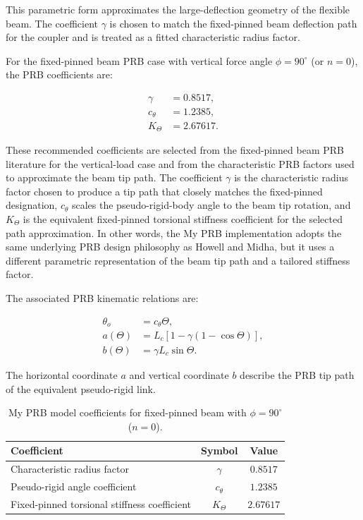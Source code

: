 \documentclass[colorlinks,upint,subscriptcorrection,varvw,hyphenate]{asmeconf}
\begin{document}
This parametric form approximates the large-deflection geometry of the flexible beam. The coefficient $\gamma$ is chosen to match the fixed-pinned beam deflection path for the coupler and is treated as a fitted characteristic radius factor.

For the fixed-pinned beam PRB case with vertical force angle $\phi = 90^\circ$ (or $n = 0$), the PRB coefficients are:

\begin{align}
    \gamma &= 0.8517, \\
    c_{\theta} &= 1.2385, \\
    K_{\Theta} &= 2.67617.
\end{align}

These recommended coefficients are selected from the fixed-pinned beam PRB literature for the vertical-load case and from the characteristic PRB factors used to approximate the beam tip path. The coefficient $\gamma$ is the characteristic radius factor chosen to produce a tip path that closely matches the fixed-pinned designation, $c_{\theta}$ scales the pseudo-rigid-body angle to the beam tip rotation, and $K_{\Theta}$ is the equivalent fixed-pinned torsional stiffness coefficient for the selected path approximation. In other words, the My PRB implementation adopts the same underlying PRB design philosophy as Howell and Midha, but it uses a different parametric representation of the beam tip path and a tailored stiffness factor.

The associated PRB kinematic relations are:

\begin{align}
    \theta_o &= c_{\theta} \Theta, \\
    a(\Theta) &= L_c \left[1 - \gamma\left(1 - \cos\Theta\right)\right], \\
    b(\Theta) &= \gamma L_c \sin\Theta.
\end{align}

The horizontal coordinate $a$ and vertical coordinate $b$ describe the PRB tip path of the equivalent pseudo-rigid link.

\begin{table}[h!]
\centering
\caption{My PRB model coefficients for fixed-pinned beam with $\phi = 90^\circ$ ($n = 0$).}
\begin{tabular}{lcc}
\hline
Coefficient & Symbol & Value \\
\hline
Characteristic radius factor & $\gamma$ & $0.8517$ \\
Pseudo-rigid angle coefficient & $c_{\theta}$ & $1.2385$ \\
Fixed-pinned torsional stiffness coefficient & $K_{\Theta}$ & $2.67617$ \\
\hline
\end{tabular}
\end{table}
\end{document}
